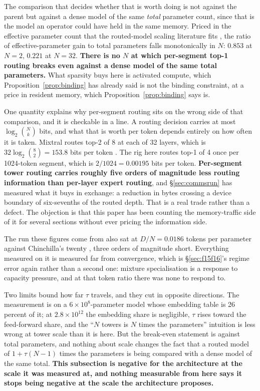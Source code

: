 \documentclass[11pt]{article}
\begin{document}
The comparison that decides whether that is worth doing is not against the parent but against a dense model of the same \emph{total} parameter count, since that is the model an operator could have held in the same memory. Priced in the effective parameter count that the routed-model scaling literature fits \cite{clark2022routed}, the ratio of effective-parameter gain to total parameters falls monotonically in $N$: $0.853$ at $N=2$, $0.221$ at $N=32$. \textbf{There is no $N$ at which per-segment top-1 routing breaks even against a dense model of the same total parameters.} What sparsity buys here is activated compute, which Proposition~\ref{prop:binding} has already said is not the binding constraint, at a price in resident memory, which Proposition~\ref{prop:binding} says is.

One quantity explains why per-segment routing sits on the wrong side of that comparison, and it is checkable in a line. A routing decision carries at most $\log_2\binom{N}{k}$ bits, and what that is worth per token depends entirely on how often it is taken. Mixtral routes top-2 of 8 at each of 32 layers, which is $32\log_2\binom{8}{2} = 153.8$ bits per token \cite{jiang2024mixtral}. The rig here routes top-1 of 4 once per 1024-token segment, which is $2/1024 = 0.00195$ bits per token. \textbf{Per-segment tower routing carries roughly five orders of magnitude less routing information than per-layer expert routing}, and \S\ref{sec:commsrun} has measured what it buys in exchange: a reduction in bytes crossing a device boundary of six-sevenths of the routed depth. That is a real trade rather than a defect. The objection is that this paper has been counting the memory-traffic side of it for several sections without ever pricing the information side.

The run these figures come from also sat at $D/N = 0.0186$ tokens per parameter against Chinchilla's twenty \cite{hoffmann2022}, three orders of magnitude short. Everything measured on it is measured far from convergence, which is \S\ref{sec:f15f16}'s regime error again rather than a second one: mixture specialisation is a response to capacity pressure, and at that token ratio there was none to respond to.

Two limits bound how far $\tau$ travels, and they cut in opposite directions. The measurement is on a $6\times10^{8}$-parameter model whose embedding table is 26 percent of it; at $2.8\times10^{12}$ the embedding share is negligible, $\tau$ rises toward the feed-forward share, and the ``$N$ towers is $N$ times the parameters'' intuition is less wrong at tower scale than it is here. But the break-even statement is against total parameters, and nothing about scale changes the fact that a routed model of $1 + \tau(N-1)$ times the parameters is being compared with a dense model of the same total. \textbf{This subsection is negative for the architecture at the scale it was measured at, and nothing measurable from here says it stops being negative at the scale the architecture proposes.}
\end{document}
